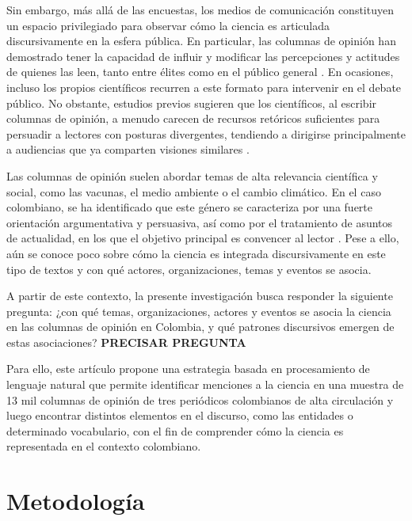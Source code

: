 \documentclass[11pt,a4paper]{article}
\begin{document}
	Sin embargo, más allá de las encuestas, los medios de comunicación constituyen un espacio privilegiado para observar cómo la ciencia es articulada discursivamente en la esfera pública. En particular, las columnas de opinión han demostrado tener la capacidad de influir y modificar las percepciones y actitudes de quienes las leen, tanto entre élites como en el público general \cite{Coppock2018}. En ocasiones, incluso los propios científicos recurren a este formato para intervenir en el debate público. No obstante, estudios previos sugieren que los científicos, al escribir columnas de opinión, a menudo carecen de recursos retóricos suficientes para persuadir a lectores con posturas divergentes, tendiendo a dirigirse principalmente a audiencias que ya comparten visiones similares \cite{Syfert2025}.
	
	Las columnas de opinión suelen abordar temas de alta relevancia científica y social, como las vacunas, el medio ambiente o el cambio climático. En el caso colombiano, se ha identificado que este género se caracteriza por una fuerte orientación argumentativa y persuasiva, así como por el tratamiento de asuntos de actualidad, en los que el objetivo principal es convencer al lector \cite{CaroLopera2020}. Pese a ello, aún se conoce poco sobre cómo la ciencia es integrada discursivamente en este tipo de textos y con qué actores, organizaciones, temas y eventos se asocia.
	
	A partir de este contexto, la presente investigación busca responder la siguiente pregunta: ¿con qué temas, organizaciones, actores y eventos se asocia la ciencia en las columnas de opinión en Colombia, y qué patrones discursivos emergen de estas asociaciones? \textbf{PRECISAR PREGUNTA}
	
	Para ello, este artículo propone una estrategia basada en procesamiento de lenguaje natural que permite identificar menciones a la ciencia en una muestra de 13 mil columnas de opinión de tres periódicos colombianos de alta circulación y luego encontrar distintos elementos en el discurso, como las entidades o determinado vocabulario, con el fin de comprender cómo la ciencia es representada en el contexto colombiano.
	
	
	\section{Metodología}
	
\end{document}
